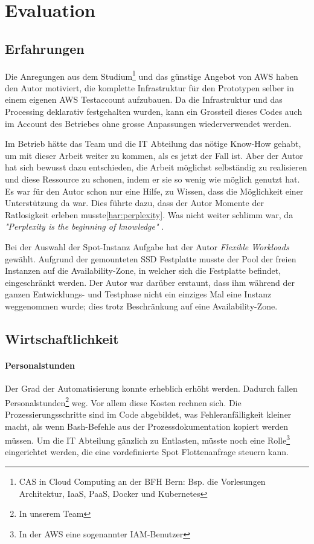 \section{Evaluation}
\subsection{Erfahrungen}
Die Anregungen aus dem Studium\footnote{CAS in Cloud Computing an der BFH Bern: Bsp. die Vorlesungen Architektur, IaaS, PaaS, Docker und Kubernetes} und das günstige Angebot von AWS haben den Autor motiviert, die komplette Infrastruktur für den Prototypen selber in einem eigenen AWS Testaccount aufzubauen. Da die Infrastruktur und das Processing deklarativ festgehalten wurden, kann ein Grossteil dieses Codes auch im Account des Betriebes ohne grosse Anpassungen wiederverwendet werden.

Im Betrieb hätte das Team und die IT Abteilung das nötige Know-How gehabt, um mit dieser Arbeit weiter zu kommen, als es jetzt der Fall ist. Aber der Autor hat sich bewusst dazu entschieden, die Arbeit möglichst selbständig zu realisieren und  diese Ressource zu schonen, indem er sie so wenig wie möglich genutzt hat. Es war für den Autor schon nur eine Hilfe, zu Wissen, dass die Möglichkeit einer Unterstützung da war. Dies führte dazu, dass der Autor Momente der Ratlosigkeit erleben musste\ref{har:perplexity}. Was nicht weiter schlimm war, da \textit{"Perplexity is the beginning of knowledge"} \autocite[33]{CloudNativ:1}.

Bei der Auswahl der Spot-Instanz Aufgabe hat der Autor \emph{Flexible Workloads} gewählt. Aufgrund der gemounteten SSD Festplatte musste der Pool der freien Instanzen auf die Availability-Zone, in welcher sich die Festplatte befindet, eingeschränkt werden. Der Autor war darüber erstaunt, dass ihm während der ganzen Entwicklungs- und Testphase nicht ein einziges Mal eine Instanz weggenommen wurde; dies trotz Beschränkung auf eine Availability-Zone.


\subsection{Wirtschaftlichkeit}
\paragraph{Personalstunden}
Der Grad der Automatisierung konnte erheblich erhöht werden. Dadurch fallen Personalstunden\footnote{In unserem Team} weg. Vor allem diese Kosten rechnen sich. Die Prozessierungsschritte sind im Code abgebildet, was Fehleranfälligkeit kleiner macht, als wenn Bash-Befehle aus der Prozessdokumentation kopiert werden müssen. Um die IT Abteilung gänzlich zu Entlasten, müsste noch eine Rolle\footnote{In der AWS eine sogenannter IAM-Benutzer} eingerichtet werden, die eine vordefinierte Spot Flottenanfrage steuern kann.
